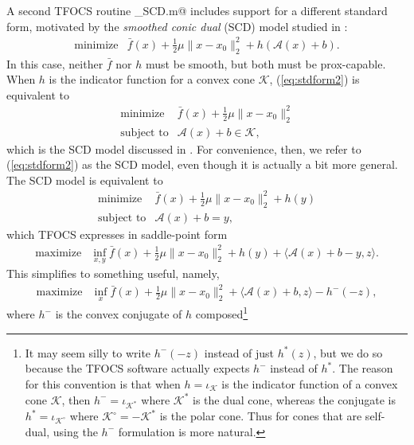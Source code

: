 \documentclass{article}
\newcommand{\cA}{\ensuremath{\mathcal{A}}}    %
\newcommand{\cK}{\ensuremath{\mathcal{K}}}    %
\newcommand\thalf{{\textstyle\frac{1}{2}}}
\newcommand{\<}{\langle}
\renewcommand{\>}{\rangle}
\begin{document}
A second TFOCS routine \verb@tfocs_SCD.m@ includes support for a 
different standard form, motivated
by the \emph{smoothed conic dual} (SCD) model studied in \cite{TFOCS}:
\begin{equation}
	\label{eq:stdform2}
	\begin{array}{ll}
	\text{minimize} & \bar{f}(x) + \thalf\mu\|x-x_0\|_2^2 + h(\cA(x)+b).
	\end{array}
\end{equation}
In this case, neither $\bar{f}$ nor $h$ must be smooth, but both must
be prox-capable. When $h$ is the indicator function for a convex cone
$\cK$, (\ref{eq:stdform2}) is equivalent to
\begin{equation}
	\label{eq:stdform3} %
	\begin{array}{ll}
          \text{minimize} &\bar{f}(x) + \thalf\mu\|x-x_0\|_2^2 \\
          \text{subject to} & \cA(x) + b \in \cK,
	\end{array}
\end{equation}
which is the SCD model discussed in \cite{TFOCS}. For convenience,
then, we refer to (\ref{eq:stdform2}) as the SCD model, even though it
is actually a bit more general.  The SCD model is equivalent to 
\[
	\begin{array}{ll}
          \text{minimize} &\bar{f}(x) + \thalf\mu\|x-x_0\|_2^2 + h(y)\\
          \text{subject to} & \cA(x) + b = y,
	\end{array}
\]
which TFOCS expresses in saddle-point form
\[
	\begin{array}{ll}
          \text{maximize} & \inf_{x,y} \bar{f}(x) + \thalf\mu\|x-x_0\|_2^2 + h(y) + \< \cA(x)+ b -y,z\>. 
	\end{array}
\]
This simplifies to something useful, namely,
\begin{equation}
	\label{eq:stdform3-saddle}
	\begin{array}{ll}
        \text{maximize} & \inf_x \bar{f}(x) + \thalf\mu\|x-x_0\|_2^2 + \< \cA(x)+b,z\> - h^{-}(-z),
	\end{array}
\end{equation}
where $h^{-}$ is the convex conjugate of $h$ composed\footnote{
It may seem silly to write $h^{-}(-z)$ instead of just $h^*(z)$, but we do
so because the TFOCS software actually expects $h^{-}$ instead of $h^*$.
The reason for this convention is that when $h=\iota_{\cK}$ is the indicator
function of a convex cone $\cK$, then $h^{-}=\iota_{\cK^*}$ where $\cK^*$ is the dual
cone, whereas the conjugate is $h^* = \iota_{\cK^{\circ}}$ where $\cK^{\circ} = -\cK^*$
is the polar cone. Thus for cones that are self-dual, using the $h^{-}$ formulation
is more natural.
}
\end{document}
